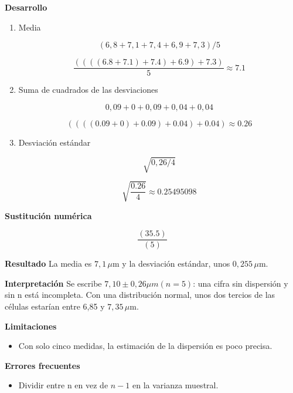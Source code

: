 \documentclass{book}
\begin{document}
\begin{tcolorbox}[title={Problema resuelto}, studiumworked, breakable]
\begin{enumerate}
\end{enumerate}

\noindent\textbf{Desarrollo}
\begin{enumerate}
\item
Media


\[
(6,8+7,1+7,4+6,9+7,3)/5
\]

\[
\frac{\left(\left(\left(\left(6.8+7.1\right)+7.4\right)+6.9\right)+7.3\right)}{5} \approx 7.1
\]
\item
Suma de cuadrados de las desviaciones


\[
0,09+0+0,09+0,04+0,04
\]

\[
\left(\left(\left(\left(0.09+0\right)+0.09\right)+0.04\right)+0.04\right) \approx 0.26
\]
\item
Desviación estándar


\[
\sqrt{0{,}26/4}
\]

\[
\sqrt{\frac{0.26}{4}} \approx 0.25495098
\]
\end{enumerate}

\noindent\textbf{Sustitución numérica}

\[
\frac{\left(35.5\right)}{\left(5\right)}
\]

\noindent\textbf{Resultado}
La media es \(7{,}1\,\mu\mathrm{m}\) y la desviación estándar, unos \(0{,}255\,\mu\mathrm{m}\).


\noindent\textbf{Interpretación}
Se escribe \(7,10 \pm 0,26 \mu m (n = 5)\): una cifra sin dispersión y sin n está incompleta. Con una distribución normal, unos dos tercios de las células estarían entre 6,85 y \(7{,}35\,\mu\mathrm{m}\).


\noindent\textbf{Limitaciones}
\begin{itemize}
\item Con solo cinco medidas, la estimación de la dispersión es poco precisa.
\end{itemize}

\noindent\textbf{Errores frecuentes}
\begin{itemize}
\item Dividir entre n en vez de \(n - 1\) en la varianza muestral.
\end{itemize}
\end{tcolorbox}
\end{document}

